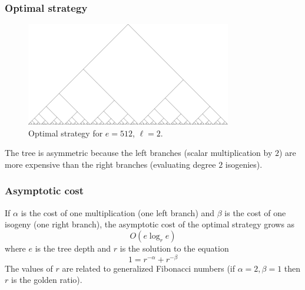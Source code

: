 \documentclass{beamer}
\begin{document}
\begin{frame}
\frametitle{Optimal strategy}
\begin{figure}[t]
  \centering
  \includegraphics[width=0.8\textwidth]{../optimal.png}
  \caption{Optimal strategy for $e=512$, $\ell=2$.}
  \label{fig:optimal}
\end{figure}

The tree is asymmetric because the left branches (scalar
multiplication by $2$) are more expensive than the right branches
(evaluating degree $2$ isogenies).
\end{frame}

\begin{frame}
\frametitle{Asymptotic cost}
If $\alpha$ is the cost of one
multiplication (one left branch) and $\beta$ is the cost of one
isogeny (one right branch), the asymptotic cost of the optimal
strategy grows as
\[
    O(e \log_r e)
\]
where $e$ is the tree depth and $r$ is the solution to the equation
\[
   1 = r^{-\alpha} + r^{-\beta}
\]
The values of $r$ are related to generalized Fibonacci numbers (if
$\alpha=2,\beta=1$ then $r$ is the golden ratio).
\end{frame}
\end{document}
